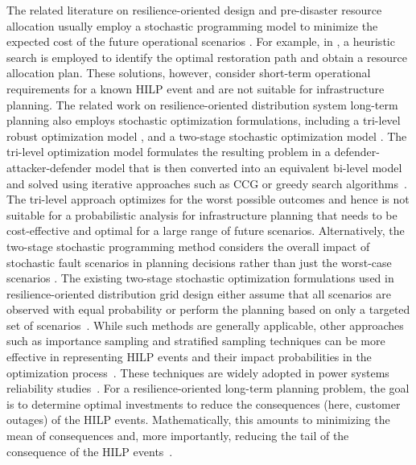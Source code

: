 The related literature on resilience-oriented design and pre-disaster resource allocation usually employ a stochastic programming model to minimize the expected cost of the future operational scenarios  \cite{gao2017resilience , zhang2021stochastic}. For example, in \cite{gao2017resilience}, a heuristic search is employed to identify the optimal restoration path and obtain a resource allocation plan. These solutions, however, consider short-term operational requirements for a known HILP event and are not suitable for infrastructure planning. The related work on resilience-oriented distribution system long-term planning also employs stochastic optimization formulations, including a tri-level robust optimization model \cite{yuan2016robust, wang2018resilience}, and a two-stage stochastic optimization model \cite{ma2018resilience, ma2019resilience, liu2019unified}. The tri-level optimization model formulates the resulting problem in a defender-attacker-defender model that is then converted into an equivalent bi-level model and solved using iterative approaches such as CCG or greedy search algorithms~\cite{yuan2016robust}. The tri-level approach optimizes for the worst possible outcomes and hence is not suitable for a probabilistic analysis for infrastructure planning that needs to be cost-effective and optimal for a large range of future scenarios. Alternatively, the two-stage stochastic programming method considers the overall impact of stochastic fault scenarios in planning decisions rather than just the worst-case scenarios \cite{ma2018resilience, shi2020resilience}. The existing two-stage stochastic optimization formulations used in resilience-oriented distribution grid design either assume that all scenarios are observed with equal probability or perform the planning based on only a targeted set of scenarios~\cite{2021IASTATE, 8329529, 9136725}. While such methods are generally applicable, other approaches such as importance sampling and stratified sampling techniques can be more effective in representing HILP events and their impact probabilities in the optimization process~\cite{glynn1989importance, rush2000stratified}. These techniques are widely adopted in power systems reliability studies~\cite{8887536, 7084698}. For a resilience-oriented long-term planning problem, the goal is to determine optimal investments to reduce the consequences (here, customer outages) of the HILP events. Mathematically, this amounts to minimizing the mean of consequences and, more importantly, reducing the tail of the consequence of the HILP events~\cite{9120304}.
